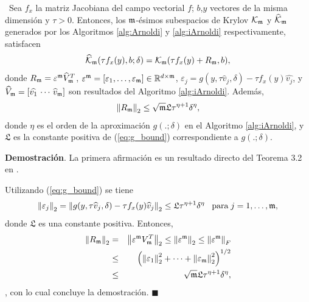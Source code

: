 \begin{theorem} \label{theorem:krilobapproxequality} \cite{naranjo2023jacobian}~Sea $f_x$ la matriz Jacobiana del campo vectorial $f$; $b$,$y$ vectores de la misma dimensión y $\tau>0$. Entonces, los $\mathfrak{m}$-ésimos subespacios de Krylov $\mathcal{K}_{\mathfrak{m}}$ y $\widehat{\mathcal{K}}_{\mathfrak{m}}$ generados por los Algoritmos \ref{alg:Arnoldi} y \ref{alg:iArnoldi} respectivamente, satisfacen 
	\[ \widehat{\mathcal{K}}_{\mathfrak{m}}(\tau f_x(y),b;\delta) = \mathcal{K}_{\mathfrak{m}}(\tau f_x(y)+R_{\mathfrak{m}},b), \]
	donde $R_{\mathfrak{m}} =  \varepsilon^{\mathfrak{m}}\widehat{V}^T_{\mathfrak{m}}$,  
	$\varepsilon^{\mathfrak{m}} = [\varepsilon_1,\dots,\varepsilon_{\mathfrak{m}}] \in \mathbb{R}^{d\times \mathfrak{m}}$, $\varepsilon_j = g(y,\tau\widehat{v}_j,\delta)- \tau f_x(y)\widehat{v_j}$, y $\widehat{V}_{\mathfrak{m}}=[\widehat{v_1}\,\cdots \,\widehat{v}_{\mathfrak{m}}]$ son resultados del Algoritmo \ref{alg:iArnoldi}. Además, 
	\[ \left\lVert R_{\mathfrak{m}} \right\rVert_2\leq \sqrt{\mathfrak{m}}\mathfrak{L} \tau^{\eta+1}\delta^{\eta}, \]
	donde $\eta$ es el orden de la aproximación $g(.;\delta)$ en el Algoritmo \ref{alg:iArnoldi}, y $\mathfrak{L}$ es la constante positiva de (\ref{eq:g_bound}) correspondiente a $g(.;\delta)$.
\end{theorem}
\textbf{Demostración}. La primera afirmación es un resultado directo del Teorema 3.2 en \cite{brown1987local}.

Utilizando  (\ref{eq:g_bound}) se tiene
\[ \left\lVert \varepsilon_j \right\rVert_2=\left\lVert g(y,\tau\widehat{v}_j,\delta)-\tau f_x(y)\widehat{v}_j \right\rVert_2 \leq  \mathfrak{L} \tau^{\eta+1}\delta^{\eta}\;\;\;\text{para}\;j=1,\dots,\mathfrak{m}, \]
donde $\mathfrak{L}$ es una constante positiva. Entonces, 
\begin{eqnarray*}
	\left\lVert R_{\mathfrak{m}} \right\rVert_2 & = & \left\lVert \varepsilon^{\mathfrak{m}} V_{\mathfrak{m}}^T \right\rVert_2\leq\left\lVert \varepsilon^{\mathfrak{m}} \right\rVert_2\leq \left\lVert \varepsilon^{\mathfrak{m}} \right\rVert_F \\
	& \leq & \left( \left\lVert \varepsilon_1 \right\rVert_2^2 + \cdots + \left\lVert \varepsilon_{\mathfrak{m}} \right\rVert_2^2 \right)^{1/2} \\
	& \leq & \sqrt{\mathfrak{m}}\mathfrak{L} \tau^{\eta+1}\delta^{\eta},
\end{eqnarray*}
, con lo cual concluye la demostración. $\blacksquare$\\

